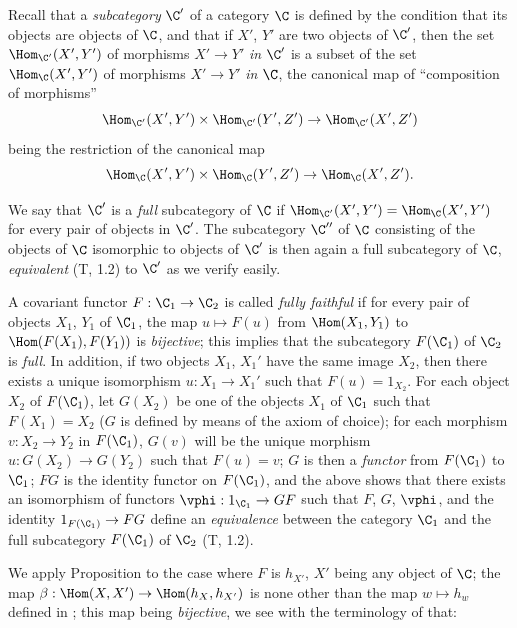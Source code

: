\begin{env}[8.1.5]
\label{0.8.1.5}
Recall that a \emph{subcategory} $\C'$ of a category $\C$ is defined by the condition that its objects
are objects of $\C$, and that if $X'$, $Y'$ are two objects of $\C'$, then the set
$\Hom_{\C'}(X',Y')$ of morphisms $X'\to Y'$ \emph{in $\C'$} is a subset of the set $\Hom_\C(X',Y')$ of
morphisms $X'\to Y'$ \emph{in $\C$}, the canonical map of ``composition of morphisms''
\[
  \Hom_{\C'}(X',Y')\times\Hom_{\C'}(Y',Z')\to\Hom_{\C'}(X',Z')
\]
being the restriction of the canonical map
\[
  \Hom_\C(X',Y')\times\Hom_\C(Y',Z')\to\Hom_\C(X',Z').
\]

We say that $\C'$ is a \emph{full} subcategory of $\C$ if $\Hom_{\C'}(X',Y')=\Hom_\C(X',Y')$ for every
pair of objects in $\C'$. The subcategory $\C''$ of $\C$ consisting of the objects of $\C$ isomorphic to
objects of $\C'$ is then again a full subcategory of $\C$, \emph{equivalent} (T, 1.2) to $\C'$ as we
verify easily.

A covariant functor $F:\C_1\to\C_2$ is called \emph{fully faithful} if for every pair of objects
$X_1$, $Y_1$ of $\C_1$, the map $u\mapsto F(u)$ from $\Hom(X_1,Y_1)$ to $\Hom(F(X_1),F(Y_1))$ is
\emph{bijective}; this implies that the subcategory $F(\C_1)$ of $\C_2$ is \emph{full}. In addition,
if two objects $X_1$, $X_1'$ have the same image $X_2$, then there exists a unique isomorphism
$u:X_1\to X_1'$ such that $F(u)=1_{X_2}$. For each object $X_2$ of $F(\C_1)$, let $G(X_2)$ be one of
the objects $X_1$ of $\C_1$ such that $F(X_1)=X_2$ ($G$ is defined by means of the axiom of choice); for
each morphism $v:X_2\to Y_2$ in $F(\C_1)$, $G(v)$ will be the unique morphism $u:G(X_2)\to G(Y_2)$ such
that $F(u)=v$; $G$ is then a \emph{functor} from $F(\C_1)$ to $\C_1$; $FG$ is the identity functor on
$F(\C_1)$, and the above shows that there exists an isomorphism of functors $\vphi:1_{\C_1}\to GF$
such that $F$, $G$, $\vphi$, and the identity $1_{F(\C_1)}\to FG$ define an \emph{equivalence} between
the category $\C_1$ and the full subcategory $F(\C_1)$ of $\C_2$ (T, 1.2).
\end{env}

\begin{env}[8.1.6]
\label{0.8.1.6}
We apply Proposition  to the case where $F$ is $h_{X'}$, $X'$ being any
object of $\C$; the map $\beta:\Hom(X,X')\to\Hom(h_X,h_{X'})$ is none other than the map
$w\mapsto h_w$ defined in ; this map being \emph{bijective}, we see
with the terminology of  that:
\end{env}

